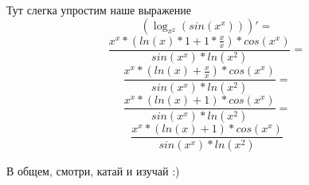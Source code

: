 \documentclass[a4paper,12pt]{article}
\begin{document}
Тут слегка упростим наше выражение
\begin{equation}
\left( \log_{{x }^ {2 }}\left( {sin \left( {{x }^ {x }}\right) }\right) \right)' =
\end{equation}
\begin{equation}
\frac{{{{{x }^ {x }}* {\left( {{ln \left( {x }\right) }* {1 }}+ {{1 }* {\frac{{x }}{{x }}}}\right) }}* {cos \left( {{x }^ {x }}\right) }}}{{{sin \left( {{x }^ {x }}\right) }* {ln \left( {{x }^ {2 }}\right) }}}=
\end{equation}
\begin{equation}
\frac{{{{{x }^ {x }}* {\left( {ln \left( {x }\right) }+ {\frac{{x }}{{x }}}\right) }}* {cos \left( {{x }^ {x }}\right) }}}{{{sin \left( {{x }^ {x }}\right) }* {ln \left( {{x }^ {2 }}\right) }}}=
\end{equation}
\begin{equation}
\frac{{{{{x }^ {x }}* {\left( {ln \left( {x }\right) }+ {1 }\right) }}* {cos \left( {{x }^ {x }}\right) }}}{{{sin \left( {{x }^ {x }}\right) }* {ln \left( {{x }^ {2 }}\right) }}}=
\end{equation}
\begin{equation}
\frac{{{{{x }^ {x }}* {\left( {ln \left( {x }\right) }+ {1 }\right) }}* {cos \left( {{x }^ {x }}\right) }}}{{{sin \left( {{x }^ {x }}\right) }* {ln \left( {{x }^ {2 }}\right) }}}
\end{equation}

В общем, смотри, катай и изучай :)
\end{document}

